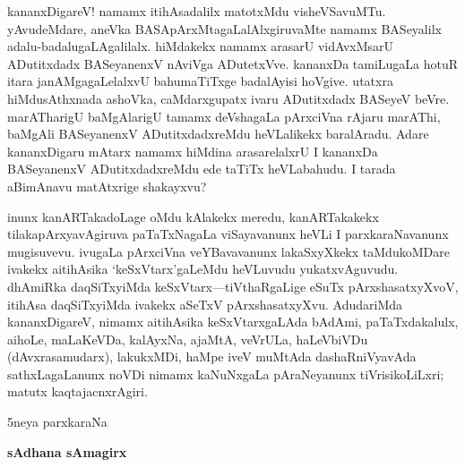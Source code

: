 \documentclass[11pt,a4size]{article}
\begin{document}
kananxDigareV! namamx itihAsadalilx matotxMdu
visheVSavuMTu. yAvudeMdare, aneVka BASApArxMtagaLalAlxgiruvaMte namamx
BASeyalilx adalu-badalugaLAgalilalx. hiMdakekx namamx arasarU
vidAvxMsarU ADutitxdadx BASeyanenxV nAviVga ADutetxVve. kananxDa
tamiLugaLa hotuR itara janAMgagaLelalxvU bahumaTiTxge badalAyisi
hoVgive. utatxra hiMdusAthxnada ashoVka, caMdarxgupatx ivaru
ADutitxdadx BASeyeV beVre. marATharigU baMgAlarigU tamamx deVshagaLa
pArxciVna rAjaru marAThi, baMgAli BASeyanenxV ADutitxdadxreMdu
heVLalikekx baralAradu. Adare kananxDigaru mAtarx namamx hiMdina
arasarelalxrU I kananxDa BASeyanenxV ADutitxdadxreMdu ede taTiTx
heVLabahudu. I tarada aBimAnavu matAtxrige shakayxvu?

inunx kanARTakadoLage oMdu kAlakekx meredu, kanARTakakekx
tilakapArxyavAgiruva paTaTxNagaLa viSayavanunx heVLi I
parxkaraNavanunx mugisuvevu. ivugaLa pArxciVna veYBavavanunx
lakaSxyXkekx taMdukoMDare ivakekx aitihAsika `keSxVtarx'gaLeMdu
heVLuvudu yukatxvAguvudu. dhAmiRka daqSiTxyiMda
keSxVtarx---tiVthaRgaLige eSuTx pArxshasatxyXvoV, itihAsa daqSiTxyiMda
ivakekx aSeTxV pArxshasatxyXvu. AdudariMda kananxDigareV, nimamx
aitihAsika keSxVtarxgaLAda bAdAmi, paTaTxdakalulx, aihoLe, maLaKeVDa,
kalAyxNa, ajaMtA, veVrULa, haLeVbiVDu (dAvxrasamudarx), lakukxMDi,
haMpe iveV muMtAda dashaRniVyavAda sathxLagaLanunx noVDi nimamx
kaNuNxgaLa pAraNeyanunx tiVrisikoLiLxri; matutx kaqtajacnxrAgiri.

\bigskip

\begin{center}
{\Huge 5neya parxkaraNa}

\smallskip
\textbf{\LARGE sAdhana sAmagirx}
\end{center}
 
\end{document}
